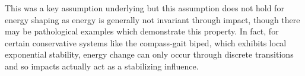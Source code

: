 \documentclass[english]{article}
\begin{document}
%
This was a key assumption underlying \cite{Ames2014} but this assumption does
not hold for energy shaping as energy is generally not invariant through impact,
though there may be pathological examples which demonstrate this property.
%
In fact, for certain conservative systems like the compass-gait biped, which
exhibits local exponential stability, energy change can only occur through
discrete transitions and so impacts actually act as a stabilizing influence.
%
%
%
\end{document}

